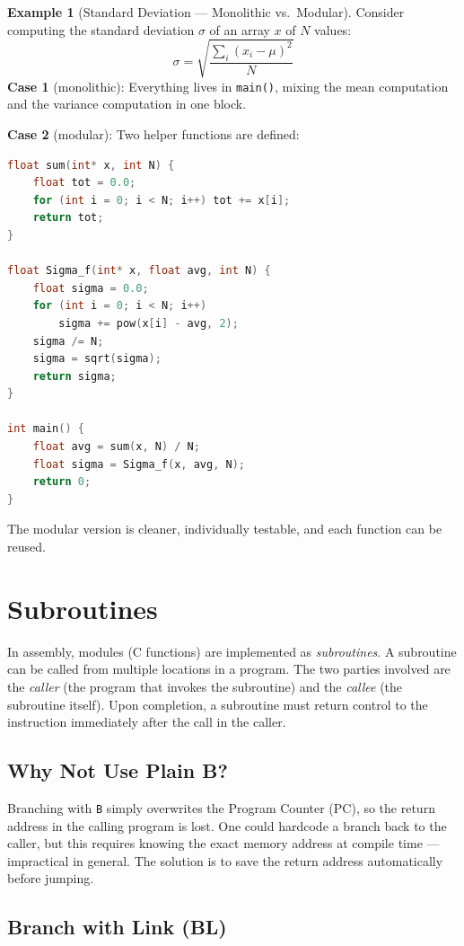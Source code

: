 \documentclass[11pt, a4paper, notitlepage]{report}
\theoremstyle{definition}
\theoremstyle{remark}
\theoremstyle{definition}
\newtheorem{example}[theorem]{Example}
\begin{document}
\begin{example}[Standard Deviation --- Monolithic vs.\ Modular]
Consider computing the standard deviation $\sigma$ of an array $x$ of $N$ values:
\[
  \sigma = \sqrt{\frac{\sum_i (x_i - \mu)^2}{N}}
\]
\textbf{Case 1} (monolithic): Everything lives in \texttt{main()}, mixing the mean computation and the variance computation in one block.

\textbf{Case 2} (modular): Two helper functions are defined:
\begin{lstlisting}[language=C]
float sum(int* x, int N) {
    float tot = 0.0;
    for (int i = 0; i < N; i++) tot += x[i];
    return tot;
}

float Sigma_f(int* x, float avg, int N) {
    float sigma = 0.0;
    for (int i = 0; i < N; i++)
        sigma += pow(x[i] - avg, 2);
    sigma /= N;
    sigma = sqrt(sigma);
    return sigma;
}

int main() {
    float avg = sum(x, N) / N;
    float sigma = Sigma_f(x, avg, N);
    return 0;
}
\end{lstlisting}
The modular version is cleaner, individually testable, and each function can be reused.
\end{example}

\section{Subroutines}

In assembly, modules (C functions) are implemented as \emph{subroutines}. A subroutine can be called from multiple locations in a program. The two parties involved are the \emph{caller} (the program that invokes the subroutine) and the \emph{callee} (the subroutine itself). Upon completion, a subroutine must return control to the instruction immediately after the call in the caller.

\subsection{Why Not Use Plain B?}

Branching with \texttt{B} simply overwrites the Program Counter (PC), so the return address in the calling program is lost. One could hardcode a branch back to the caller, but this requires knowing the exact memory address at compile time --- impractical in general. The solution is to save the return address automatically before jumping.

\subsection{Branch with Link (BL)}
\end{document}
